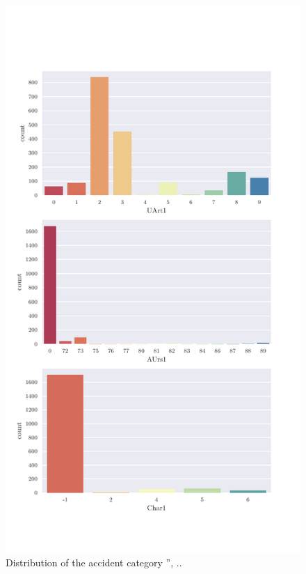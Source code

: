 \documentclass[a4paper,headsepline,footsepline,fontsize=11pt,BCOR=12mm,DIV=12]{report}
\begin{document}
\begin{appendices}
\begin{figure}[h]
	\centering
	\includegraphics[scale=0.7]{../CorrAnalysis/data/BAYSIS/03_selected_01_startJam/plots/baysis_selected_count_multiple03}
	\caption{Distribution of the accident category '', ..}
	\label{img:appendix_baysis_selected_01_03}
\end{figure}


\end{appendices}
\end{document}
